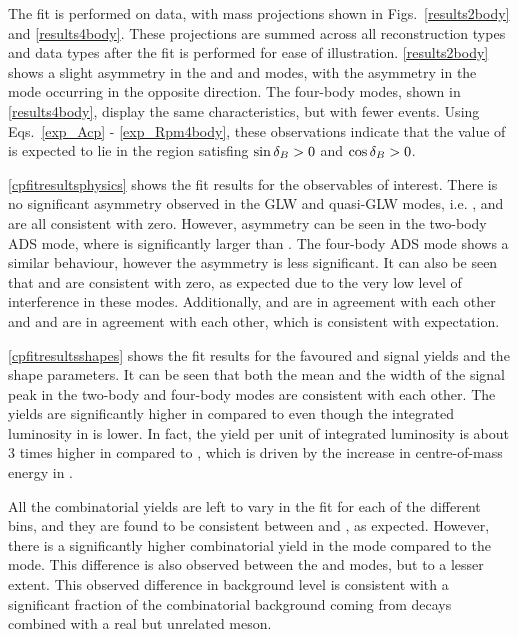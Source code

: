 The \CP fit is performed on data, with mass projections shown in Figs.~\ref{results2body} and \ref{results4body}. These projections are summed across all \KS reconstruction types and data types after the fit is performed for ease of illustration. \Fig\ref{results2body} shows a slight asymmetry in the \kk and \pipi and \pik modes, with the asymmetry in the \pik mode occurring in the opposite direction. The four-body modes, shown in \fig\ref{results4body}, display the same characteristics, but with fewer events. Using Eqs.~\ref{exp_Acp} - \ref{exp_Rpm4body}, these observations indicate that the value of \deltab is expected to lie in the region satisfing $\sin\delta_B > 0$ and $\cos\delta_B >0$. 

\Tab\ref{cpfitresultsphysics} shows the \CP fit results for the \CP observables of interest. There is no significant asymmetry observed in the GLW and quasi-GLW modes, i.e. \Akk, \Apipi and \Apipipipi are all consistent with zero. However, asymmetry can be seen in the two-body ADS mode, where \Rptwo is significantly larger than \Rmtwo. The four-body ADS mode shows a similar behaviour, however the asymmetry is less significant. It can also be seen that \Akpi and \Akpipipi are consistent with zero, as expected due to the very low level of interference in these modes. Additionally, \Akk and \Apipi are in agreement with each other and \Rkk and \Rpipi are in agreement with each other, which is consistent with expectation.

\Tab\ref{cpfitresultsshapes} shows the fit results for the favoured \kpi and \kpipipi signal yields and the shape parameters. It can be seen that both the mean and the width of the signal peak in the two-body and four-body modes are consistent with each other. The yields are significantly higher in \runtwo compared to \runone even though the integrated luminosity in \runtwo is lower. In fact, the yield per unit of integrated luminosity is about 3 times higher in \runone compared to \runtwo, which is driven by the increase in centre-of-mass energy in \runtwo. 

All the combinatorial yields are left to vary in the \CP fit for each of the different bins, and they are found to be consistent between \Bm and \Bp, as expected. However, there is a significantly higher combinatorial yield in the \kpi mode compared to the \pik mode. This difference is also observed between the \kpipipi and \pikpipi modes, but to a lesser extent. This observed difference in background level is consistent with a significant fraction of the combinatorial background coming from  decays combined with a real but unrelated \KS meson. 

